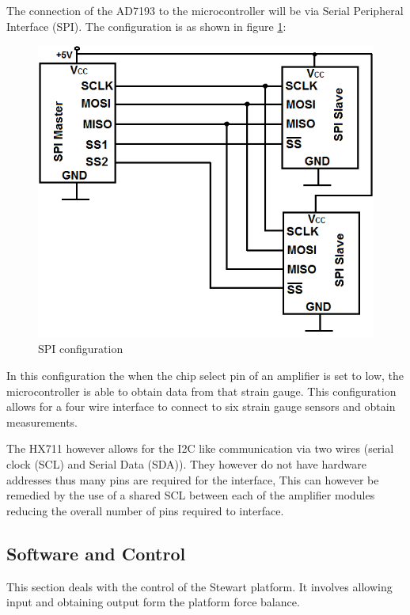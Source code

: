 The connection of the AD7193 to the microcontroller will be via Serial Peripheral Interface (SPI). The configuration is as shown in figure \ref{spi}:
\begin{center}
	\begin{figure}[H]
		\centering
		\includegraphics[width=0.55\linewidth]{Figures/SPI}
		\caption[SPI configuration]{SPI configuration}
		\label{spi}
	\end{figure}
\end{center}
In this configuration the when the chip select pin of an amplifier is set to low, the microcontroller is able to obtain data from that strain gauge. This configuration allows for a four wire interface to connect to six strain gauge sensors and obtain measurements.

The HX711 however allows for the I2C like communication via two wires (serial clock (SCL) and Serial Data (SDA)). They however do not have hardware addresses thus many pins are required for the interface, This can however be remedied by the use of a shared SCL between each of the amplifier modules reducing the overall number of pins required to interface.

\subsection{Software and Control}
This section deals with the control of the Stewart platform. It involves allowing input and obtaining output form the platform force balance.
